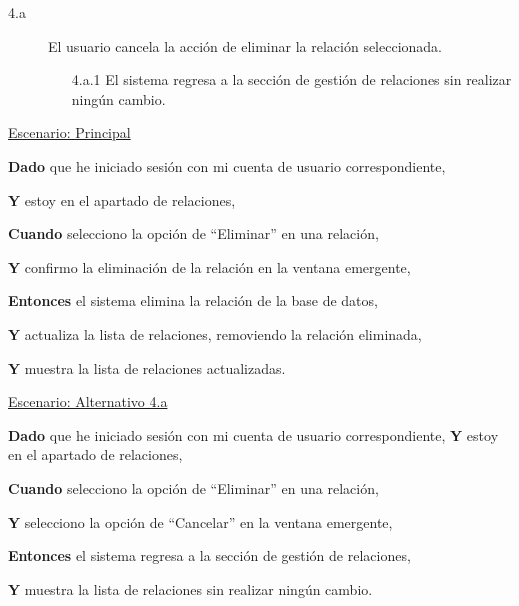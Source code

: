 \begin{description}
  
    \item[4.a] El usuario cancela la acción de eliminar la relación seleccionada.
    \begin{enumerate}
        \item[4.a.1] El sistema regresa a la sección de gestión de relaciones sin realizar ningún cambio.
    \end{enumerate}
\end{description}

\underline{Escenario: Principal}\par
\vspace{0.15cm}

\textbf{Dado} que he iniciado sesión con mi cuenta de usuario correspondiente,\par
\textbf{Y} estoy en el apartado de relaciones,\par
\textbf{Cuando} selecciono la opción de \enquote{Eliminar} en una relación,\par
\textbf{Y} confirmo la eliminación de la relación en la ventana emergente,\par
\textbf{Entonces} el sistema elimina la relación de la base de datos,\par
\textbf{Y} actualiza la lista de relaciones, removiendo la relación eliminada,\par
\textbf{Y} muestra la lista de relaciones actualizadas.\par

\vspace{0.20cm}

\underline{Escenario: Alternativo 4.a}\par
\vspace{0.15cm}

\textbf{Dado} que he iniciado sesión con mi cuenta de usuario correspondiente,
\textbf{Y} estoy en el apartado de relaciones,\par
\textbf{Cuando} selecciono la opción de \enquote{Eliminar} en una relación,\par
\textbf{Y} selecciono la opción de \enquote{Cancelar} en la ventana emergente,\par
\textbf{Entonces} el sistema regresa a la sección de gestión de relaciones,\par
\textbf{Y} muestra la lista de relaciones sin realizar ningún cambio.\par



